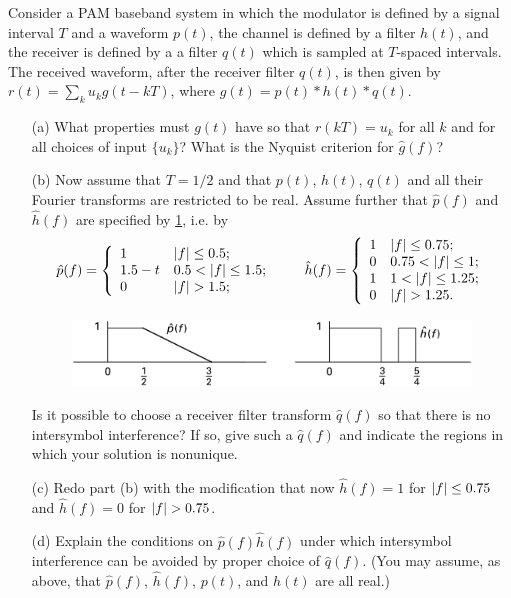 \documentclass{assignment}
\begin{document}
\begin{prob}[6.6, Nyquist]
    Consider a PAM baseband system in which the modulator is defined by a signal interval $T$ and a waveform $p(t)$, the channel is defined by a filter $h(t)$, and the receiver is defined by a a filter $q(t)$ which is sampled at $T$-spaced intervals. The received waveform, after the receiver filter $q(t)$, is then given by $r(t)=\sum_ku_kg(t-kT)$, where $g(t)=p(t)*h(t)*q(t)$.
    \begin{itemize}
        \item[(a)] What properties must $g(t)$ have so that $r(kT)=u_k$ for all $k$ and for all choices of input $\{u_k\}$? What is the Nyquist criterion for $\hat{g}(f)$?
        \item[(b)] Now assume that $T=1/2$ and that $p(t)$, $h(t)$, $q(t)$ and all their Fourier transforms are restricted to be real. Assume further that $\hat{p}(f)$ and $\hat{h}(f)$ are specified by \ref{Figure 6.10}, i.e. by
        \[
            \hat{p}(f)=\left\{\begin{array}{ll}
                1&\left\lvert f\right\rvert\leq 0.5;\\
                1.5-t&0.5<\left\lvert f\right\rvert\leq 1.5;\\
                0&\left\lvert f\right\rvert>1.5;
            \end{array}\right.\qquad\hat{h}(f)=\left\{\begin{array}{ll}
                1&\left\lvert f\right\rvert\leq 0.75;\\
                0&0.75<\left\lvert f\right\rvert\leq 1;\\
                1&1<\left\lvert f\right\rvert\leq 1.25;\\
                0&\left\lvert f\right\rvert>1.25.
            \end{array}\right.
        \]
        \begin{figure}[h]
            \centering
            \includegraphics[width=.5\columnwidth]{Assignment-10-Figure-6.10.png}
            \caption{}
            \label{Figure 6.10}
        \end{figure}
        Is it possible to choose a receiver filter transform $\hat{q}(f)$ so that there is no intersymbol interference? If so, give such a $\hat{q}(f)$ and indicate the regions in which your solution is nonunique.
        \item[(c)] Redo part (b) with the modification that now $\hat{h}(f)=1$ for $\left\lvert f\right\rvert\leq 0.75$ and $\hat{h}(f)=0$ for $\left\lvert f\right\rvert>0.75$.
        \item[(d)] Explain the conditions on $\hat{p}(f)\hat{h}(f)$ under which intersymbol interference can be avoided by proper choice of $\hat{q}(f)$. (You may assume, as above, that $\hat{p}(f)$, $\hat{h}(f)$, $p(t)$, and $h(t)$ are all real.)
    \end{itemize}
\end{prob}
\end{document}
